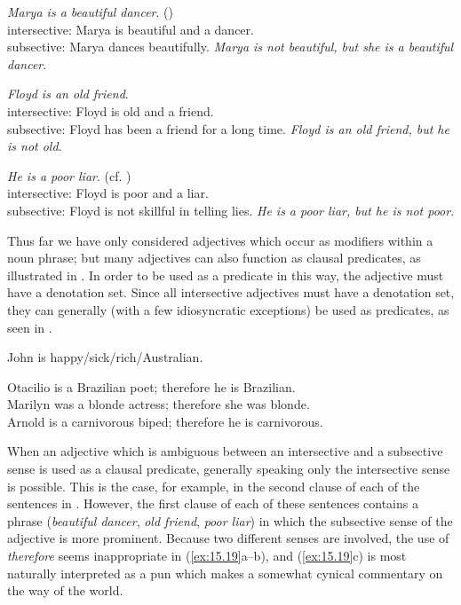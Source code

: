 \ea \label{ex:15.14}
\ea   \textit{Marya is a beautiful dancer}.  \hfill  (\citealt{Siegel1976})\\
intersective: Marya is beautiful and a dancer.\\
subsective: Marya dances beautifully.
\ex  \textit{Marya is not beautiful, but she is a beautiful dancer}.
\z \z

\ea \label{ex:15.15}
\ea  \textit{Floyd is an old friend}. \\
intersective: Floyd is old and a friend.\\
subsective: Floyd has been a friend for a long time.
\ex  \textit{Floyd is an old friend, but he is not old}.
\z \z

\ea \label{ex:15.16}
\ea   \textit{He is a poor liar}.  \hfill (cf. \citealt{Bolinger1967})\\
intersective: Floyd is poor and a liar.\\
subsective: Floyd is not skillful in telling lies.
\ex  \textit{He is a poor liar, but he is not poor}.
\z \z


Thus far we have only considered adjectives which occur as modifiers within a noun phrase; but many adjectives can also function as clausal predicates, as illustrated in . In order to be used as a predicate in this way, the adjective must have a denotation set. Since all intersective adjectives must have a denotation set, they can generally (with a few idiosyncratic exceptions) be used as predicates, as seen in .


\ea \label{ex:15.17}
John is happy/sick/rich/{Australian}.
\z

\ea \label{ex:15.18}
\ea  Otacilio is a {Brazilian} poet; therefore he is {Brazilian}.\\
\ex Marilyn was a blonde actress; therefore she was blonde.\\
\ex Arnold is a carnivorous biped; therefore he is carnivorous.
                       \z
\z


When an adjective which is ambiguous between an intersective and a subsective sense is used as a clausal predicate, generally speaking only the intersective sense is possible. This is the case, for example, in the second clause of each of the sentences in . However, the first clause of each of these sentences contains a phrase (\textit{beautiful dancer}, \textit{old friend}, \textit{poor liar}) in which the subsective sense of the adjective is more prominent. Because two different senses are involved, the use of \textit{therefore} seems inappropriate in (\ref{ex:15.19}a–b), and (\ref{ex:15.19}c) is most naturally interpreted as a pun which makes a somewhat cynical commentary on the way of the world.


